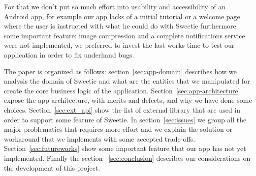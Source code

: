 For that we don't put so much effort into usability and accessibility of an Android app, for example our app lacks of a initial tutorial or a welcome page where the user is instructed with what he could do with Sweetie furthermore some important feature: image compression and a complete notifications service were not implemented, we preferred to invest the last works time to test our application in order to fix underhand bugs.

The paper is organized as follows: section~\ref{sec:app-domain} describes how we analysis the domain of Sweetie and what are the entities that we manipulated for create the core business logic of the application. Section~\ref{sec:app-architecture} expose the app architecture, with merits and defects, and why we have done some choices. Section~\ref{sec:ext_api} show the list of external library that are used in order to support some feature of Sweetie. In section~\ref{sec:issues} we group all the major problematics that requires more effort and we explain the solution or workaround that we implements with some accepted trade-offs. Section~\ref{sec:futureworks}  show some important feature that our app has not yet implemented. Finally the section ~\ref{sec:conclusion} describes our considerations on the development of this project.
